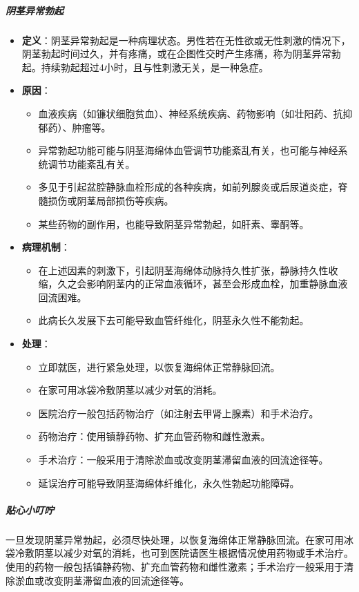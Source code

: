 \subparagraph{阴茎异常勃起}
\begin{itemize}
\item \textbf{定义}：阴茎异常勃起是一种病理状态。男性若在无性欲或无性刺激的情况下，阴茎勃起时间过久，并有疼痛，或在企图性交时产生疼痛，称为阴茎异常勃起。持续勃起超过4小时，且与性刺激无关，是一种急症。
\item \textbf{原因}：
  \begin{itemize}
  \item 血液疾病（如镰状细胞贫血）、神经系统疾病、药物影响（如壮阳药、抗抑郁药）、肿瘤等。
  \item 异常勃起功能可能与阴茎海绵体血管调节功能紊乱有关，也可能与神经系统调节功能紊乱有关。
  \item 多见于引起盆腔静脉血栓形成的各种疾病，如前列腺炎或后尿道炎症，脊髓损伤或阴茎局部损伤等疾病。
  \item 某些药物的副作用，也能导致阴茎异常勃起，如肝素、睾酮等。
  \end{itemize}
\item \textbf{病理机制}：
  \begin{itemize}
  \item 在上述因素的刺激下，引起阴茎海绵体动脉持久性扩张，静脉持久性收缩，久之会影响阴茎内的正常血液循环，甚至会形成血栓，加重静脉血液回流困难。
  \item 此病长久发展下去可能导致血管纤维化，阴茎永久性不能勃起。
  \end{itemize}
\item \textbf{处理}：
  \begin{itemize}
  \item 立即就医，进行紧急处理，以恢复海绵体正常静脉回流。
  \item 在家可用冰袋冷敷阴茎以减少对氧的消耗。
  \item 医院治疗一般包括药物治疗（如注射去甲肾上腺素）和手术治疗。
  \item 药物治疗：使用镇静药物、扩充血管药物和雌性激素。
  \item 手术治疗：一般采用于清除淤血或改变阴茎滞留血液的回流途径等。
  \item 延误治疗可能导致阴茎海绵体纤维化，永久性勃起功能障碍。
  \end{itemize}
\end{itemize}

\subparagraph{贴心小叮咛}

一旦发现阴茎异常勃起，必须尽快处理，以恢复海绵体正常静脉回流。在家可用冰袋冷敷阴茎以减少对氧的消耗，也可到医院请医生根据情况使用药物或手术治疗。使用的药物一般包括镇静药物、扩充血管药物和雌性激素；手术治疗一般采用于清除淤血或改变阴茎滞留血液的回流途径等。

